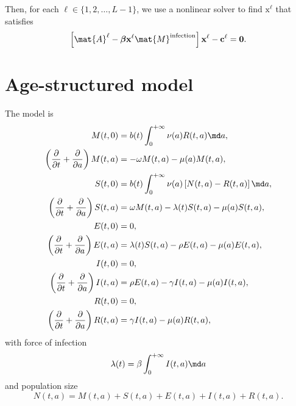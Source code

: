 \documentclass{jpmarticle}
\renewcommand{\vec}[1]{\boldsymbol{\mathrm{#1}}}
\begin{document}
Then, for each $\ell \in \{1, 2, \ldots, L - 1\}$,
we use a nonlinear solver to find $\vec{x}^{\ell}$ that satisfies
\begin{equation}
  \left[
    \mat{A}^{\ell}
    - \vec{\beta} \vec{x}^{\ell} \mat{M}^{\text{infection}}
  \right] \vec{x}^{\ell}
  - \vec{c}^{\ell}
  = \vec{0}.
\end{equation}


\section{Age-structured model}

The model is
\begin{equation}
  \label{model_age_structured}
  \begin{split}
    M(t, 0)
    &= b(t) \int_0^{+\infty} \nu(a) R(t, a) \md a,
    \\
    \left(\frac{\partial}{\partial t}
      + \frac{\partial}{\partial a}\right)
    M(t, a)
    &= - \omega M(t, a) - \mu(a) M(t, a),
    \\
    S(t, 0)
    &= b(t) \int_0^{+\infty} \nu(a) \left[N(t, a) - R(t, a)\right] \md a,
    \\
    \left(\frac{\partial}{\partial t}
      + \frac{\partial}{\partial a}\right)
    S(t, a)
    &= \omega M(t, a) - \lambda(t) S(t, a) - \mu(a) S(t, a),
    \\
    E(t, 0)
    &= 0,
    \\
    \left(\frac{\partial}{\partial t}
      + \frac{\partial}{\partial a}\right)
    E(t, a)
    &= \lambda(t) S(t, a) - \rho E(t, a) - \mu(a) E(t, a),
    \\
    I(t, 0)
    &= 0,
    \\
    \left(\frac{\partial}{\partial t}
      + \frac{\partial}{\partial a}\right)
    I(t, a)
    &= \rho E(t, a) - \gamma I(t, a) - \mu(a) I(t, a),
    \\
    R(t, 0)
    &= 0,
    \\
    \left(\frac{\partial}{\partial t}
      + \frac{\partial}{\partial a}\right)
    R(t, a)
    &= \gamma I(t, a) - \mu(a) R(t, a),
  \end{split}
\end{equation}
with force of infection
\begin{equation}
  \lambda(t) = \beta \int_0^{+\infty} I(t, a) \md a
\end{equation}
and population size
\begin{equation}
  N(t, a) = M(t, a) + S(t, a) + E(t, a) + I(t, a) + R(t, a).
\end{equation}
\end{document}
